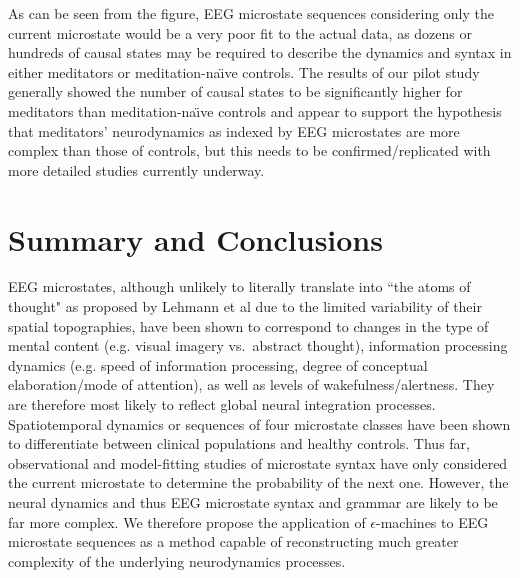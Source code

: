 \documentclass[journal]{IEEEtran}
\begin{document}
As can be seen from the figure, EEG microstate sequences considering only the current microstate would be a very poor fit to the actual data, as dozens or hundreds of causal states may be required to describe the dynamics and syntax in either meditators or meditation-na\"{\i}ve controls. The results of our pilot study  generally showed the number of causal states to be significantly higher for meditators than meditation-na\"{\i}ve controls \cite{GwynThesis} and appear to support the hypothesis that meditators' neurodynamics as indexed by EEG microstates are more complex than those of controls, but this needs to be confirmed/replicated with more detailed studies currently underway.


\newpage
\section{Summary and Conclusions}\label{Conc}
EEG microstates, although unlikely to literally translate into ``the atoms of thought" as proposed by Lehmann et al \cite{Lehmann1998} due to the limited variability of their spatial topographies, have been shown to correspond to changes in the type of mental content (e.g. visual imagery vs.\ abstract thought), information processing dynamics (e.g. speed of information processing, degree of conceptual elaboration/mode of attention), as well as levels of wakefulness/alertness. They are therefore most likely to reflect global neural integration processes. Spatiotemporal dynamics or sequences of four microstate classes have been shown to differentiate between clinical populations and healthy controls. Thus far, observational and model-fitting studies of microstate syntax have only considered the current microstate to determine the probability of the next one.  However, the neural dynamics and thus EEG microstate syntax and grammar are likely to be far more complex. We therefore propose the application of $\epsilon$-machines to EEG microstate sequences as a method capable of reconstructing much greater complexity of the underlying neurodynamics processes. 
 
\end{document}
